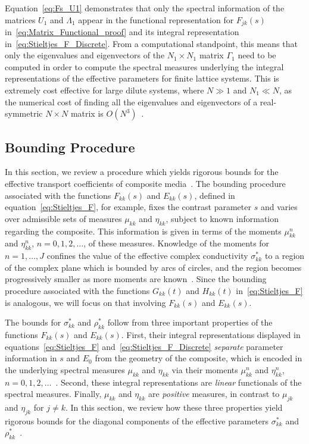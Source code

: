 \documentclass{cmslatex}
\begin{document}
Equation~\eqref{eq:Fs_U1} demonstrates that only the spectral
information of the matrices $U_1$ and $\Lambda_1$ appear in the functional
representation for $F_{jk}(s)$ in~\eqref{eq:Matrix_Functional_proof}
and its integral representation
in~\eqref{eq:Stieltjes_F_Discrete}. From a computational standpoint,  
this means that only the eigenvalues and eigenvectors of the $N_1\times N_1$
matrix $\Gamma_1$ need to be computed in order to compute the spectral
measures underlying the integral representations of the effective
parameters for finite lattice systems. This is extremely cost
effective for large dilute systems, where $N\gg1$ and $N_1\ll N$, as the
numerical cost of finding all the eigenvalues and eigenvectors of a
real-symmetric $N\times N$ matrix is $O(N^3)$~\cite{Demmel:1997}.






\subsection{Bounding Procedure}\label{sec:Bounding_Procedure}
%
In this section, we review a procedure which yields rigorous bounds for
the effective transport coefficients of composite
media~\cite{Golden:CMP-473,Golden:JMPS-333}. The bounding procedure 
associated with the functions $F_{kk}(s)$ and $E_{kk}(s)$, 
defined in equation~\eqref{eq:Stieltjes_F}, for example, fixes the
contrast parameter $s$ and varies over admissible sets of measures
$\mu_{kk}$ and $\eta_{kk}$, subject to
known information regarding the composite. This information is given
in terms of the moments $\mu_{kk}^n$ and $\eta_{kk}^n$, $n=0,1,2,\ldots$, of
these measures. Knowledge of the moments for $n=1,\ldots,J$ confines the
value of the effective complex conductivity $\sigma_{kk}^*$ to a region of
the complex plane which is bounded by arcs of circles, and the region
becomes progressively smaller as more moments are
known~\cite{Milton:JAP-5294,Golden:JMPS-333}. Since the bounding
procedure associated with the functions $G_{kk}(t)$ and $H_{kk}(t)$
in~\eqref{eq:Stieltjes_F} is analogous, we will focus on that
involving $F_{kk}(s)$ and $E_{kk}(s)$.    


The bounds for $\sigma_{kk}^*$ and $\rho^*_{kk}$ follow from three important
properties of the functions $F_{kk}(s)$ and $E_{kk}(s)$. First, their
integral representations displayed in equations~\eqref{eq:Stieltjes_F}
and~\eqref{eq:Stieltjes_F_Discrete} \emph{separate} parameter
information in $s$ and $E_0$ from the 
geometry of the composite, which is encoded in the underlying spectral
measures $\mu_{kk}$ and $\eta_{kk}$ via their moments $\mu_{kk}^n$ and
$\eta_{kk}^n$, $n=0,1,2,\ldots$~\cite{Bruno:JSP-365,Golden:CMP-473}. Second,
these integral representations are \emph{linear} functionals of the
spectral measures. Finally, $\mu_{kk}$ and $\eta_{kk}$ are \emph{positive}
measures, in contrast to $\mu_{jk}$ and $\eta_{jk}$ for $j\neq k$. In this
section, we review how these three properties yield rigorous bounds
for the diagonal components of the effective parameters $\sigma^*_{kk}$ and
$\rho^*_{kk}$~\cite{Golden:CMP-473,Golden:JMPS-333}.
\end{document}
